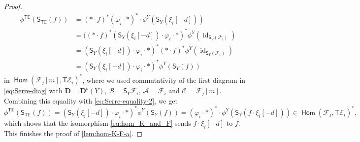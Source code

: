 \documentclass[a4paper,11pt, reqno]{amsart}
\def\E{\mathbb E}
\def\DD{\mathbf D}
\def\sA{\mathscr{A}}
\def\sB{\mathscr{B}}
\def\sC{\mathscr{C}}
\def\sE{\mathscr{E}}
\def\sF{\mathscr{F}}
\def\id{{\operatorname{id}}}
\newcommand{\opname}[1]{\operatorname{\mathsf{#1}}}
\newcommand{\Hom}{\opname{Hom}}
\def\Db{\DD^b}
\newcommand{\bS}{\mathsf{S}}
\newcommand{\bT}{\mathsf{T}}
\theoremstyle{plain}
\theoremstyle{definition}
\numberwithin{equation}{section}
\begin{document}
\begin{proof}
\begin{align*}
    \phi^{\bT\E} ( \bS_{\bT\E}(f)  ) & = (\ast \cdot f)^\ast (\varphi_i \cdot \ast )^\ast \cdot \phi^Y ( \bS_Y ( \xi_i [-d] ) ) \\
    & = ((\ast \cdot f)^\ast ( \bS_Y (\xi_i [-d]) \cdot \varphi_i \cdot \ast  )^\ast \phi^Y( \id_{\bS_Y ( \sF_i ) } )  \\
    & =  ( \bS_Y (\xi_i [-d] ) \cdot \varphi_i \cdot \ast  )^\ast ( \ast \cdot f)^\ast \phi^Y( \id_{\bS_Y ( \sF_i ) } ) \\
    & = ( \bS_Y (\xi_i [-d]) \cdot \varphi_i \cdot \ast  )^\ast \phi^Y( \bS_Y ( f ) ) 
\end{align*}
in $ \Hom ( \sF_j [m]  , \bT\sE_i )^\ast $, where we used commutativity of the first diagram in \ref{eq:Serre-diag} with $\DD = \Db(Y)$, $\sB= \bS_Y \sF_i $, $\sA = \sF_i$ and $\sC = \sF_j [m]$.
Combining this equality with \eqref{eq:Serre-equality-2}, we get 
\[
\phi^{\bT\E} ( \bS_{\bT\E}(f)  ) 
= ( \bS_Y (\xi_i [-d]) \cdot \varphi_i \cdot \ast  )^\ast \phi^Y( \bS_Y (f ) ) 
= (\varphi_i \cdot \ast )^\ast \cdot \phi^Y ( \bS_Y  ( f \cdot \xi_i [-d] ) ) \in  \Hom ( \sF_j  , \bT\sE_i )^\ast,
\]
which shows that the isomorphism \eqref{eq:hom_K_and_F} sends $f \cdot \xi_i [-d]$ to $f$.
This finishes the proof of \eqref{lem:hom-K-F-a}.


\end{proof}
\end{document}
